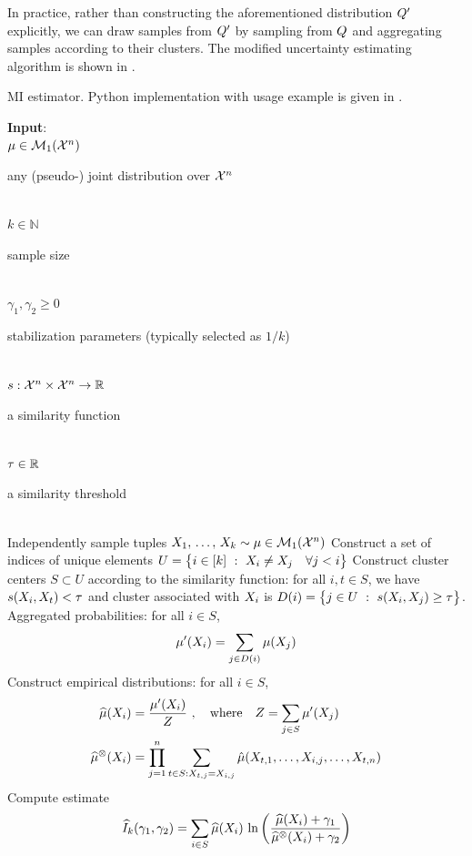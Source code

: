 \documentclass[a4paper]{article}
\theoremstyle{plain}
\theoremstyle{definition}
\theoremstyle{plain}
\begin{document}
In practice, rather than constructing the aforementioned distribution $Q'$ explicitly, we can draw samples from $Q'$ by sampling from $Q$ and aggregating samples according to their clusters. The modified uncertainty estimating algorithm is shown in . 
\begin{algorithm}[t]
\caption{MI estimator. Python implementation with usage example is given in .}
\label{alg:MI-se}
\begin{algorithmic}[1]
  \STATE \textbf{Input}:\\
  \quad $\mu \in {\mathcal{M}}_1({\mathcal{X}}^n)$ \dotfill \parbox{8cm}{ any (pseudo-) joint distribution over ${\mathcal{X}}^n$ }\\[2mm]
  \quad $k \in \mathbb{N}$ \dotfill \parbox{8cm}{ sample size }\\[2mm]
  \quad $\gamma_1, \gamma_2 \geq 0 $ \dotfill \parbox{8cm}{ stabilization parameters (typically selected as $1/k$) }\\[2mm]
  \quad $s:{\mathcal{X}}^n\times {\mathcal{X}}^n \rightarrow {\mathbb{R}}$ \dotfill \parbox{8cm}{ a similarity function }\\[2mm]
  \quad $\tau\in{\mathbb{R}}$ \dotfill \parbox{8cm}{ a similarity threshold }\\[2mm]
  \STATE Independently sample tuples $X_1, \, \ldots, \, X_k \sim \mu \in {\mathcal{M}}_1({\mathcal{X}}^n)$
  \STATE Construct a set of indices of unique elements
  $U = \big\{i \in [k] ~:~ X_i \neq X_j \quad \forall j < i \big\}$
  \STATE Construct cluster centers $S\subset U$ according to the similarity function: for all $i,t\in S$, we have $s(X_i, X_t) < \tau$ and cluster associated with $X_i$ is $D(i) = \big\{j\in U~:~ s(X_i, X_j) \ge \tau \big\}$. Aggregated probabilities: for all $i\in S$,
  \begin{align*}
      \mu'(X_i) = \sum_{j\in D(i)} \mu(X_j)
  \end{align*}
  \STATE Construct empirical distributions: for all $i \in S$,
  \begin{align*}
    \widehat \mu(X_i) &= \frac{\mu'(X_i)}{Z}~, \quad \text{where} \quad Z = \sum_{j \in S} \mu'(X_j)\\
    \widehat \mu^{\otimes}(X_i)
  &=
    \prod_{j=1}^n \sum_{t \in S : X_{t,j} = X_{i,j}} \hat \mu(X_{t,1}, \ldots, X_{i,j}, \ldots, X_{t,n})
  \end{align*}
  \STATE Compute estimate
  \begin{align*}
    \widehat I_k(\gamma_1, \gamma_2) = \sum_{i \in S} \widehat \mu(X_i) \, \ln\left( 
    \frac{\widehat \mu(X_i) + \gamma_1}{\widehat \mu^{\otimes}(X_i) + \gamma_2}
     \right)
  \end{align*}
\end{algorithmic}
\end{algorithm}
\end{document}
